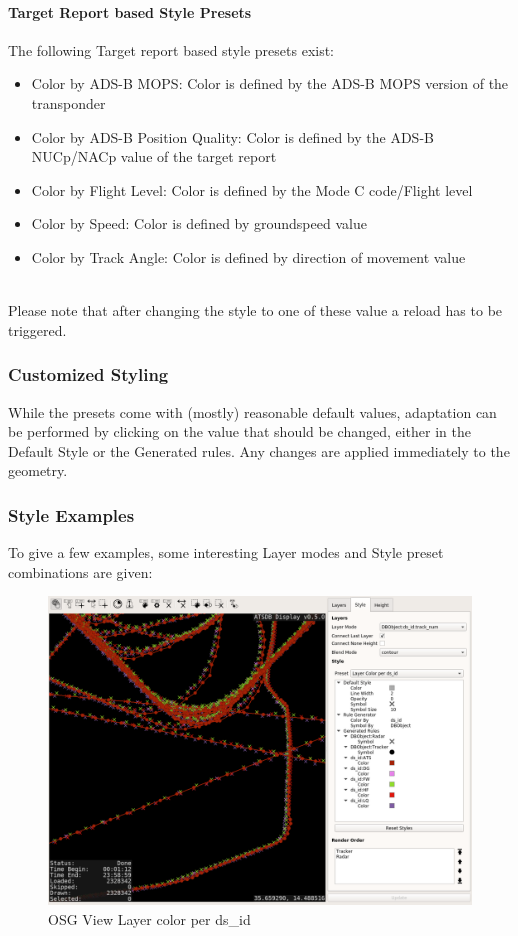 \paragraph{Target Report based Style Presets}
The following Target report based style presets exist:
\begin{itemize}
 \item Color by ADS-B MOPS: Color is defined by the ADS-B MOPS version of the transponder
 \item Color by ADS-B Position Quality: Color is defined by the ADS-B NUCp/NACp value of the target report
 \item Color by Flight Level: Color is defined by the Mode C code/Flight level
 \item Color by Speed: Color is defined by groundspeed value
 \item Color by Track Angle: Color is defined by direction of movement value
\end{itemize}
\  \\

Please note that after changing the style to one of these value a reload has to be triggered. \\

\subsubsection{Customized Styling}

While the presets come with (mostly) reasonable default values, adaptation can be performed by clicking on the value that should be changed, either in the Default Style or the Generated rules. Any changes are applied immediately to the geometry.

\subsubsection{Style Examples}

To give a few examples, some interesting Layer modes and Style preset combinations are given:

\begin{figure}[H]
    \hspace*{-2.5cm}
    \includegraphics[width=19cm,frame]{../screenshots/osgview_style_ds_id.png}
  \caption{OSG View Layer color per ds\_id}
\end{figure}

